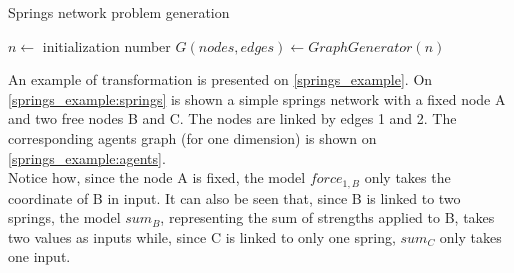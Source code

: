 \begin{algorithm}
\caption{Springs network problem generation}
\label{algo_springs}
	$n \leftarrow$ initialization number\;
	$G(nodes, edges) \leftarrow GraphGenerator(n)$\;
	
			
\end{algorithm}

An example of transformation is presented on \figurename{} \ref{springs_example}. On \figurename{} \ref{springs_example:springs} is shown a simple springs network with a fixed node A and two free nodes B and C. The nodes are linked by edges 1 and 2. The corresponding agents graph (for one dimension) is shown on \figurename{} \ref{springs_example:agents}.\\
Notice how, since the node A is fixed, the model $force_{1,B}$ only takes the coordinate of B in input. It can also be seen that, since B is linked to two springs, the model $sum_B$, representing the sum of strengths applied to B, takes two values as inputs while, since C is linked to only one spring, $sum_C$ only takes one input.

